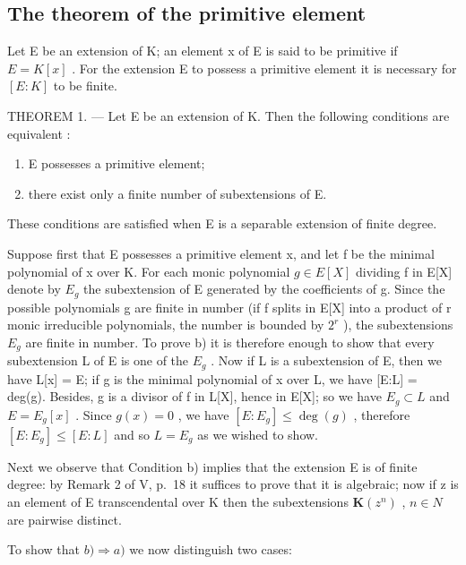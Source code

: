 \subsection{The theorem of the primitive element}

Let E be an extension of K; an element x of E is said to be primitive if \(E = K[x]\) . For the extension E to possess a primitive element it is necessary for \([E : K]\) to be finite.

THEOREM 1. --- Let E be an extension of K. Then the following conditions are equivalent :

\begin{enumerate}
\def\labelenumi{\alph{enumi})}
\item
  E possesses a primitive element;
\item
  there exist only a finite number of subextensions of E.
\end{enumerate}

These conditions are satisfied when E is a separable extension of finite degree.

Suppose first that E possesses a primitive element x, and let f be the minimal polynomial of x over K. For each monic polynomial \(g \in E[X]\) dividing f in E{[}X{]} denote by \(E_g\) the subextension of E generated by the coefficients of g. Since the possible polynomials g are finite in number (if f splits in E{[}X{]} into a product of r monic irreducible polynomials, the number is bounded by \(2^{r}\) ), the subextensions \(E_g\) are finite in number. To prove b) it is therefore enough to show that every subextension L of E is one of the \(E_g\) . Now if L is a subextension of E, then we have L{[}x{]} = E; if g is the minimal polynomial of x over L, we have {[}E:L{]} = deg(g). Besides, g is a divisor of f in L{[}X{]}, hence in E{[}X{]}; so we have \(E_g \subset L\) and \(E = E_g[x]\) . Since \(g(x) = 0\) , we have \([E : E_g] \leq \deg(g)\) , therefore \([E : E_g] \leq [E : L]\) and so \(L = E_g\) as we wished to show.

Next we observe that Condition b) implies that the extension E is of finite degree: by Remark 2 of V, p.~18 it suffices to prove that it is algebraic; now if z is an element of E transcendental over K then the subextensions \(\mathbf{K}(z^{n})\) , \(n \in N\) are pairwise distinct.

To show that \(b) \Rightarrow a)\) we now distinguish two cases:

